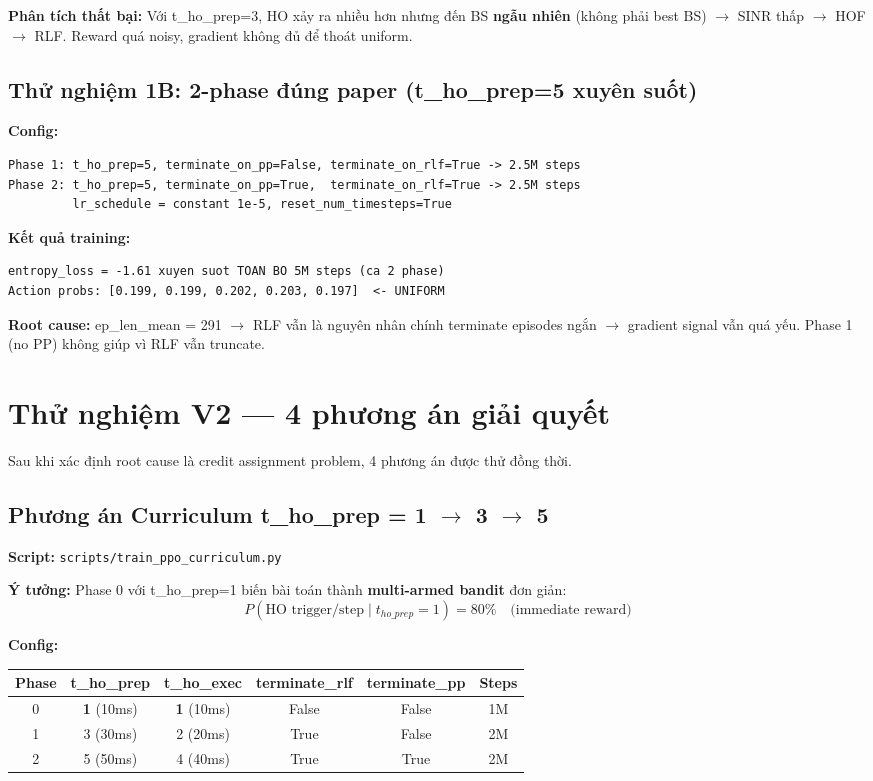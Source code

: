 \documentclass[11pt]{article}
\begin{document}
\textbf{Phân tích thất bại:} Với t\_ho\_prep=3, HO xảy ra nhiều hơn nhưng đến BS \textbf{ngẫu nhiên} (không phải best BS) $\rightarrow$ SINR thấp $\rightarrow$ HOF $\rightarrow$ RLF. Reward quá noisy, gradient không đủ để thoát uniform.

\subsection{Thử nghiệm 1B: 2-phase đúng paper (t\_ho\_prep=5 xuyên suốt)}

\textbf{Config:}
\begin{lstlisting}
Phase 1: t_ho_prep=5, terminate_on_pp=False, terminate_on_rlf=True -> 2.5M steps
Phase 2: t_ho_prep=5, terminate_on_pp=True,  terminate_on_rlf=True -> 2.5M steps
         lr_schedule = constant 1e-5, reset_num_timesteps=True
\end{lstlisting}

\textbf{Kết quả training:}
\begin{lstlisting}
entropy_loss = -1.61 xuyen suot TOAN BO 5M steps (ca 2 phase)
Action probs: [0.199, 0.199, 0.202, 0.203, 0.197]  <- UNIFORM
\end{lstlisting}

\textbf{Root cause:} ep\_len\_mean = 291 $\rightarrow$ RLF vẫn là nguyên nhân chính terminate episodes ngắn $\rightarrow$ gradient signal vẫn quá yếu. Phase 1 (no PP) không giúp vì RLF vẫn truncate.

\section{Thử nghiệm V2 --- 4 phương án giải quyết}

Sau khi xác định root cause là credit assignment problem, 4 phương án được thử đồng thời.

\subsection{Phương án Curriculum t\_ho\_prep = 1 $\to$ 3 $\to$ 5}

\textbf{Script:} \texttt{scripts/train\_ppo\_curriculum.py}

\textbf{Ý tưởng:} Phase 0 với t\_ho\_prep=1 biến bài toán thành \textbf{multi-armed bandit} đơn giản:
\[
P(\text{HO trigger/step} \mid t_{ho\_prep}=1) = 80\% \quad \text{(immediate reward)}
\]

\textbf{Config:}

\begin{longtable}{@{}cccccc@{}}
\toprule
\textbf{Phase} & \textbf{t\_ho\_prep} & \textbf{t\_ho\_exec} & \textbf{terminate\_rlf} & \textbf{terminate\_pp} & \textbf{Steps} \\
\midrule
\endhead
0 & \textbf{1} (10ms) & \textbf{1} (10ms) & False & False & 1M \\
1 & 3 (30ms) & 2 (20ms) & True & False & 2M \\
2 & 5 (50ms) & 4 (40ms) & True & True & 2M \\
\bottomrule
\end{longtable}
\end{document}
